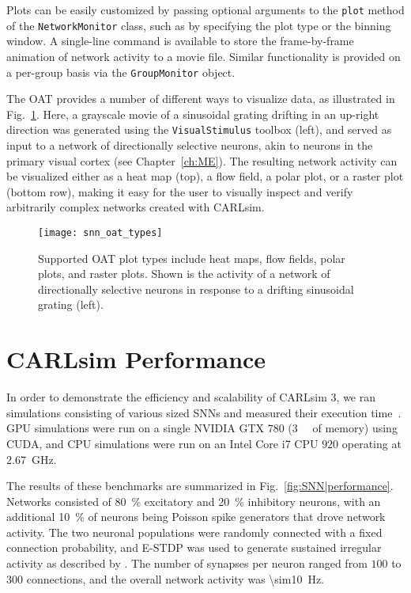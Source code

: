 Plots can be easily customized by passing optional arguments to the
\texttt{plot} method of the \texttt{NetworkMonitor} class, such as
by specifying the plot type or the binning window.
A single-line command is available to store the frame-by-frame
animation of network activity to a movie file.
Similar functionality is provided on a per-group basis via the
\texttt{GroupMonitor} object.

The \ac{OAT} provides a number of different ways to visualize
data, as illustrated in Fig.~\ref{fig:SNN|OAT|types}.
Here, a grayscale movie of a sinusoidal grating drifting in an up-right
direction was generated using the \texttt{VisualStimulus} toolbox (left),
and served as input to a network of directionally selective neurons,
akin to neurons in the primary visual cortex
(see Chapter~\ref{ch:ME}).
The resulting network activity can be visualized either as a heat map
(top), a flow field, a polar plot, or a raster plot (bottom row),
making it easy for the user to visually inspect and verify arbitrarily
complex networks created with CARLsim.

\begin{figure}[t]
  \centering
  \texttt{[image: snn\_oat\_types]}
  \caption{Supported \ac{OAT} plot types include heat maps, flow fields,
  polar plots, and raster plots.
  Shown is the activity of a network of directionally selective neurons
  in response to a drifting sinusoidal grating (left).}
  \label{fig:SNN|OAT|types}
\end{figure}



\section{CARLsim Performance}

In order to demonstrate the efficiency and scalability of
CARLsim 3, we ran simulations consisting of various sized
\acp{SNN} and measured their execution time~\citep{Beyeler2015a}.
\ac{GPU} simulations were run on a single NVIDIA GTX $780$
(\SI{3}{\giga\byte} of memory)
using \ac{CUDA}, and \ac{CPU} simulations were run on an Intel Core
i7 \ac{CPU} $920$ operating at \SI{2.67}{\giga\hertz}.

The results of these benchmarks are summarized in
Fig.~\ref{fig:SNN|performance}.
Networks consisted of \SI{80}{\percent} excitatory and 
\SI{20}{\percent} inhibitory neurons, with an additional
\SI{10}{\percent} of neurons being Poisson
spike generators that drove network activity. The two neuronal
populations were randomly connected with a fixed connection
probability, and E-\ac{STDP} was used to generate sustained
irregular activity as described by \citet{Vogels2005}.
The number of synapses per neuron ranged from $100$ to $300$
connections, and the overall network activity was \SI{\sim10}{\hertz}.

